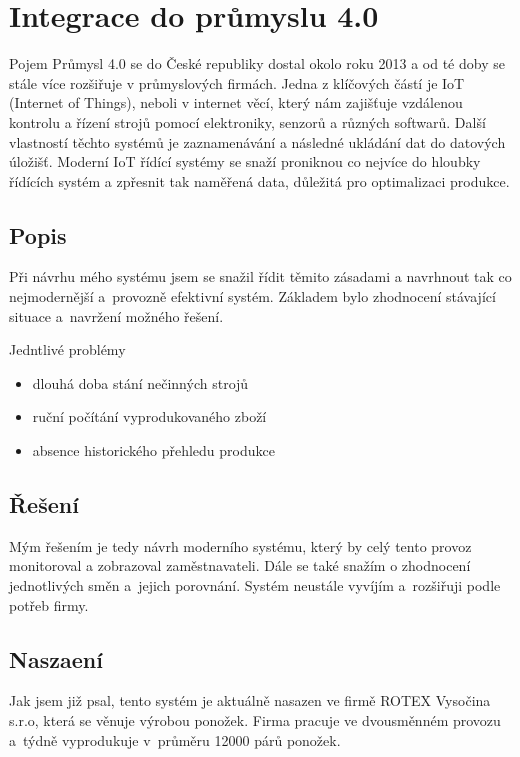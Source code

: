 \chapter{Integrace do průmyslu 4.0}
Pojem Průmysl 4.0 se do České republiky dostal okolo roku 2013 a od té doby se stále více rozšiřuje v průmyslových firmách.
Jedna z klíčových částí je IoT (Internet of Things), neboli v internet věcí, který nám zajišťuje vzdálenou kontrolu a řízení strojů pomocí elektroniky, senzorů a různých softwarů.
Další vlastností těchto systémů je zaznamenávání a následné ukládání dat do datových úložišť.
Moderní IoT řídící systémy se snaží proniknou co nejvíce do hloubky řídících systém a zpřesnit tak naměřená data, důležitá pro optimalizaci produkce.   

\section{Popis}
Při návrhu mého systému jsem se snažil řídit těmito zásadami a navrhnout tak co nejmodernější a~provozně efektivní systém.
Základem bylo zhodnocení stávající situace a~navržení možného řešení.

Jedntlivé problémy
\begin{itemize}
    \item dlouhá doba stání nečinných strojů
    \item ruční počítání vyprodukovaného zboží
    \item absence historického přehledu produkce
\end{itemize}

\section{Řešení}
Mým řešením je tedy návrh moderního systému, který by celý tento provoz monitoroval a zobrazoval zaměstnavateli.
Dále se také snažím o zhodnocení jednotlivých směn a~jejich porovnání.
Systém neustále vyvíjím a~rozšiřuji podle potřeb firmy.

\section{Naszaení}
Jak jsem již psal, tento systém je aktuálně nasazen ve firmě ROTEX Vysočina s.r.o\cite{ROTEX}, která se věnuje výrobou ponožek. 
Firma pracuje ve dvousměnném provozu a~týdně vyprodukuje v~průměru 12000 párů ponožek. 

